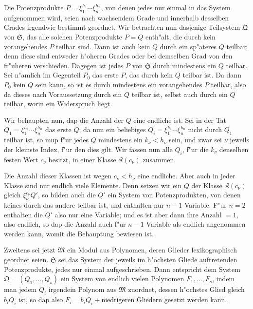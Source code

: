 \documentclass[12pt,a4paper]{article}
\begin{document}
Die Potenzprodukte $P = \xi_1^{h_1} \cdots \xi_n^{h_n}$, von denen jedes nur einmal in das System aufgenommen wird, seien nach wachsendem Grade und innerhalb desselben Grades irgendwie bestimmt geordnet. Wir betrachten nun dasjenige Teilsystem $\mathfrak{Q}$ von $\mathfrak{S}$, das alle solchen Potenzprodukte $P = Q$ enth"alt, die durch kein vorangehendes $P$ teilbar sind. Dann ist auch kein $Q$ durch ein sp"ateres $Q$ teilbar; denn diese sind entweder h"oheren Grades oder bei demselben Grad von den fr"uheren verschieden. Dagegen ist jedes $P$ von $\mathfrak{S}$ durch mindestens ein $Q$ teilbar. Sei n"amlich im Gegenteil $P_0$ das erste $P$, das durch kein $Q$ teilbar ist. Da dann $P_0$ kein $Q$ sein kann, so ist es durch mindestens ein vorangehendes $P$ teilbar, also da dieses nach Voraussetzung durch ein $Q$ teilbar ist, selbst auch durch ein $Q$ teilbar, worin ein Widerspruch liegt.

Wir behaupten nun, dap die Anzahl der $Q$ eine endliche ist. Sei in der Tat $Q_1 = \xi_1^{h_1} \cdots \xi_n^{h_n}$ das erste $Q$; da nun ein beliebiges $Q_i = \xi_1^{k_1} \cdots \xi_n^{k_n}$ nicht durch $Q_1$ teilbar ist, so mup f"ur jedes $Q$ mindestens ein $k_\nu < h_\nu$ sein, und zwar sei $\nu$ jeweils der kleinste Index, f"ur den dies gilt. Wir fassen nun alle $Q_i$, f"ur die $k_\nu$ denselben festen Wert $c_\nu$ besitzt, in einer Klasse $\mathfrak{K}(c_\nu)$ zusammen.

Die Anzahl dieser Klassen ist wegen $c_\nu < h_\nu$ eine endliche. Aber auch in jeder Klasse sind nur endlich viele Elemente. Denn setzen wir ein $Q$ der Klasse $\mathfrak{K}(c_\nu)$ gleich $\xi_\nu^{c_\nu} Q'$, so bilden auch die $Q'$ ein System von Potenzprodukten, von denen keines durch das andere teilbar ist, und enthalten nur $n-1$ Variable. F"ur $n=2$ enthalten die $Q'$ also nur eine Variable; und es ist aber dann ihre Anzahl $=1$, also endlich, so dap die Anzahl auch f"ur $n-1$ Variable als endlich angenommen werden kann, womit die Behauptung bewiesen ist.

Zweitens sei jetzt $\mathfrak{M}$ ein Modul aus Polynomen, deren Glieder lexikographisch geordnet seien. $\mathfrak{S}$ sei das System der jeweils im h"ochsten Gliede auftretenden Potenzprodukte, jedes nur einmal aufgeschrieben. Dann entspricht dem System $\mathfrak{Q} = (Q_1,\ldots,Q_s)$ ein System von endlich vielen Polynomen $F_1,\ldots,F_s$, indem man jedem $Q_i$ irgendein Polynom aus $\mathfrak{M}$ zuordnet, dessen h"ochstes Glied gleich $b_i Q_i$ ist, so dap also $F_i = b_i Q_i + \text{niedrigeren Gliedern}$ gesetzt werden kann.
\end{document}
